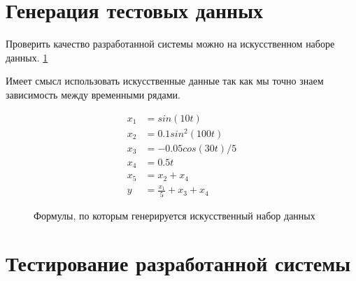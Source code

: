 
\section{Генерация тестовых данных}

Проверить качество разработанной системы можно на искусственном наборе
данных. \ref{pic:example_data_formulas}

Имеет смысл использовать искусственные данные так как мы точно знаем
зависимость между временными рядами.

\def\figurename{Формулы}
\begin{figure}[t]
	\begin{center}
	\begin{align*}
		x_1 &= sin(10t) \\
		x_2 &= 0.1 sin^2(100t) \\
		x_3 &= -0.05 cos(30t)/5 \\
		x_4 &= 0.5 t \\
		x_5 &= x_2 + x_4\\
		y   &= \frac{x_1}{5} + x_3 + x_4
	\end{align*}
	\end{center}
	\caption{Формулы, по которым генерируется искусственный набор данных}
	\label{pic:example_data_formulas}
\end{figure}
\noindent


\section{Тестирование разработанной системы}


